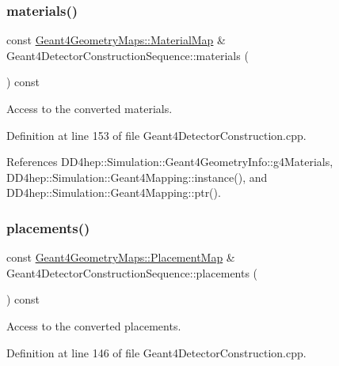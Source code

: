 \subsubsection{\texorpdfstring{materials()}{materials()}}
{\footnotesize\ttfamily const \hyperlink{namespace_d_d4hep_1_1_simulation_1_1_geant4_geometry_maps_a0ae377c64e684c47bd3045a9d3d8e248}{Geant4\+Geometry\+Maps\+::\+Material\+Map} \& Geant4\+Detector\+Construction\+Sequence\+::materials (\begin{DoxyParamCaption}{ }\end{DoxyParamCaption}) const}



Access to the converted materials. 



Definition at line 153 of file Geant4\+Detector\+Construction.\+cpp.



References D\+D4hep\+::\+Simulation\+::\+Geant4\+Geometry\+Info\+::g4\+Materials, D\+D4hep\+::\+Simulation\+::\+Geant4\+Mapping\+::instance(), and D\+D4hep\+::\+Simulation\+::\+Geant4\+Mapping\+::ptr().

\hypertarget{class_d_d4hep_1_1_simulation_1_1_geant4_detector_construction_sequence_a70efd06bdb4da2f633d756d75b5937d7}{}\label{class_d_d4hep_1_1_simulation_1_1_geant4_detector_construction_sequence_a70efd06bdb4da2f633d756d75b5937d7} 
\subsubsection{\texorpdfstring{placements()}{placements()}}
{\footnotesize\ttfamily const \hyperlink{namespace_d_d4hep_1_1_simulation_1_1_geant4_geometry_maps_a587c0a02d3847f03e6427093c90e93d2}{Geant4\+Geometry\+Maps\+::\+Placement\+Map} \& Geant4\+Detector\+Construction\+Sequence\+::placements (\begin{DoxyParamCaption}{ }\end{DoxyParamCaption}) const}



Access to the converted placements. 



Definition at line 146 of file Geant4\+Detector\+Construction.\+cpp.



